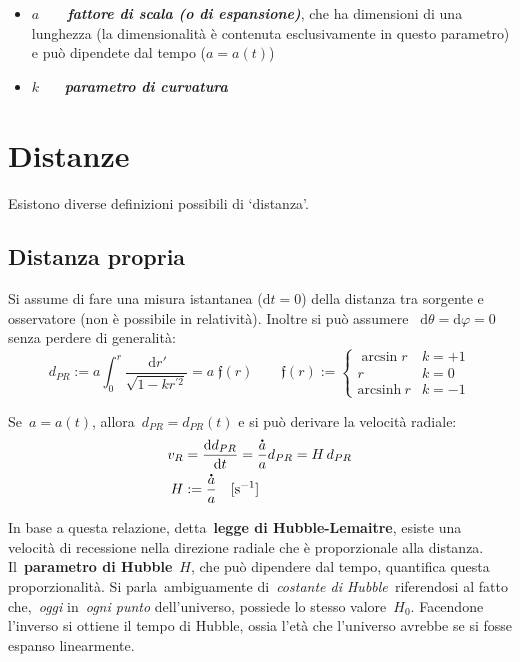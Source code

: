 \begin{itemize}
\item
  \(a\)~~~~\textbf{\emph{fattore di scala (o di
  espansione)}}, che ha dimensioni di una lunghezza (la dimensionalità è
  contenuta esclusivamente in questo parametro) e può dipendete dal
  tempo (\(a=a\left(t\right)\))
\item
  \(k\)~ ~~\textbf{\emph{parametro di curvatura}}
\end{itemize}


\section{Distanze}\label{1:sec2distanze}

Esistono diverse definizioni possibili di `distanza'.

\subsection{Distanza propria}
Si assume di fare una misura istantanea (\(\mathrm{d}t=0\)) della
distanza tra sorgente e osservatore (non è possibile in relatività).
Inoltre si può assumere~ \(\mathrm{d}\theta=\mathrm{d}\varphi=0\) senza perdere di generalità:
\begin{equation}
    d_{PR}:=a\int_{0}^{r}\frac{\,\mathrm{d}r'}{\sqrt{1-kr^{'2}}}=a\; \mathfrak{f}(r) \qquad \mathfrak{f}(r):=\left\{\begin{matrix}
\arcsin r& k=+1\\ 
r & k=0\\ 
\mathrm{arcsinh}\:  r & k=-1
\end{matrix}\right.\label{eq1:mathfrankf}
\end{equation}

Se~\(a=a\left(t\right)\), allora~\(d_{PR}=d_{PR}(t)\) e si può derivare la
velocità radiale:
\begin{align*}
v_R & =\frac{\mathrm{d}d_{PR}}{\mathrm{d}t}=\frac{\accentset{\mbox{\large\bfseries .}}{a}}{a}d_{PR}=H\,d_{PR}  \\
H & :=\frac{\accentset{\mbox{\large\bfseries .}}{a}}{a}\quad [\mathrm{s^{-1}}]
\end{align*}

In base a questa relazione, detta~\textbf{legge di Hubble-Lemaitre},
esiste una velocità di recessione nella direzione radiale che è
proporzionale alla distanza. Il~\textbf{parametro di
Hubble}~\(H\), che può dipendere dal tempo, quantifica
questa proporzionalità. Si parla~ambiguamente di~\emph{costante di
Hubble~}riferendosi al fatto che,~\emph{oggi} in~\emph{ogni punto}
dell'universo, possiede lo stesso valore~\(H_0\). Facendone
l'inverso si ottiene il tempo di Hubble, ossia l'età che l'universo
avrebbe se si fosse espanso linearmente.


